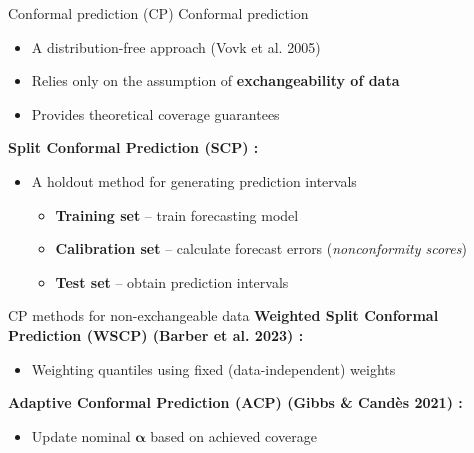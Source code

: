 \documentclass[
  12pt,
  ignorenonframetext,
  aspectratio=169,
]{beamer}
\begin{document}
\begin{frame}{Conformal prediction (CP)}
\label{conformal-prediction-cp}
\alert{Conformal prediction} \newline

\begin{itemize}
  \item A distribution-free approach (Vovk et al. 2005) 
  \item Relies only on the assumption of \textbf{exchangeability of data} 
  \item Provides theoretical coverage guarantees \newline
\end{itemize}
\pause

\color{violet}\textbf{Split Conformal Prediction (SCP) :}

\begin{itemize}
  \item A holdout method for generating prediction intervals
  \begin{itemize}
  \item \textbf{Training set} -- train forecasting model
  \item \textbf{Calibration set} -- calculate forecast errors (\textit{nonconformity scores}) 
  \item \textbf{Test set} -- obtain prediction intervals
  \end{itemize}
\end{itemize}
\end{frame}

\begin{frame}{CP methods for non-exchangeable data}
\label{cp-methods-for-non-exchangeable-data}
\color{violet}\textbf{Weighted Split Conformal Prediction (WSCP) (Barber et al. 2023) :}

\begin{itemize}
  \item Weighting quantiles using fixed (data-independent) weights \newline
\end{itemize}
\pause

\color{violet}\textbf{Adaptive Conformal Prediction (ACP) (Gibbs \& Candès 2021) :}

\begin{itemize}
  \item Update nominal $\bm{\alpha}$ based on achieved coverage
\end{itemize}
\end{frame}
\end{document}
